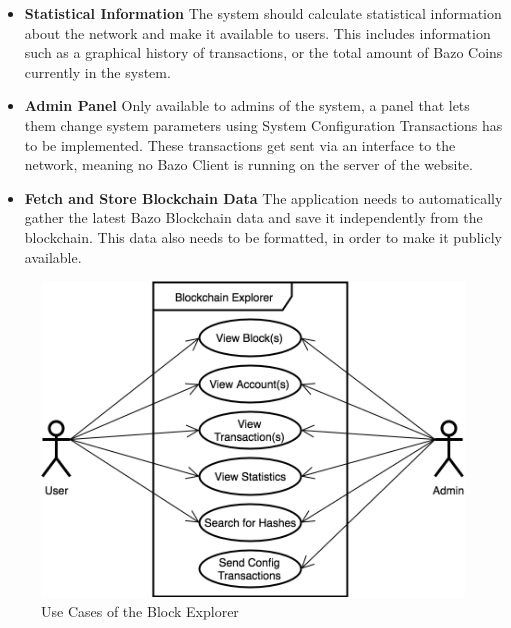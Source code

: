 \begin{itemize}
\item \textbf{Statistical Information}
The system should calculate statistical information about the network and make it available to users. This includes information such as a graphical history of transactions, or the total amount of Bazo Coins currently in the system.
\item \textbf{Admin Panel}
Only available to admins of the system, a panel that lets them change system parameters using System Configuration Transactions has to be implemented. These transactions get sent via an interface to the network, meaning no Bazo Client is running on the server of the website.
\item \textbf{Fetch and Store Blockchain Data}
The application needs to automatically gather the latest Bazo Blockchain data and save it independently from the blockchain. This data also needs to be formatted, in order to make it publicly available. 
\end{itemize}

\begin{figure}
  \includegraphics[scale=0.35]{usecase1.png}
  \centering
  \caption{Use Cases of the Block Explorer}
  \label{fig:usecase1}
\end{figure}

